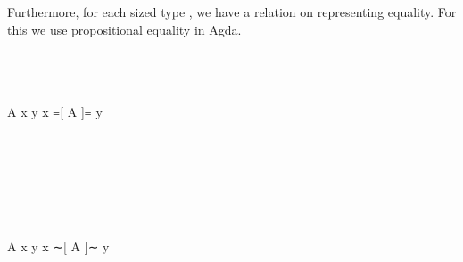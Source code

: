 Furthermore, for each sized type , we have a relation on  representing equality.
For this we use propositional equality in Agda.

\begin{code}%
\>[0]\AgdaSpace{}%
\AgdaSymbol{:}\AgdaSpace{}%
\AgdaSymbol{(}\AgdaSpace{}%
\AgdaSymbol{:}\AgdaSpace{}%
\AgdaSymbol{)}\AgdaSpace{}%
\AgdaSpace{}%
\AgdaSpace{}%
\AgdaSpace{}%
\<%
\\
\>[0]\AgdaSpace{}%
\AgdaSpace{}%
\AgdaSpace{}%
\AgdaSpace{}%
\AgdaSymbol{=}\AgdaSpace{}%
\AgdaSpace{}%
\AgdaSpace{}%
\<%
\\
%
\\[\AgdaEmptyExtraSkip]%
\>[0]\AgdaSpace{}%
 A x y \AgdaSymbol{=} x ≡[ A ]≡ y\<%
\end{code}

\begin{code}%
\>[0]\AgdaSpace{}%
\AgdaSymbol{:}\AgdaSpace{}%
\<%
\\
\>[0]\AgdaSpace{}%
\AgdaSpace{}%
\AgdaSymbol{=}\AgdaSpace{}%
\AgdaSpace{}%
\<%
\\
%
\\[\AgdaEmptyExtraSkip]%
\>[0]\AgdaSpace{}%
\AgdaSymbol{:}\AgdaSpace{}%
\AgdaSymbol{(}\AgdaSpace{}%
\AgdaSymbol{:}\AgdaSpace{}%
\AgdaSymbol{)}\AgdaSpace{}%
\AgdaSpace{}%
\AgdaSpace{}%
\AgdaSymbol{(}\AgdaSpace{}%
\AgdaSpace{}%
\AgdaSpace{}%
\AgdaSymbol{)}\AgdaSpace{}%
\AgdaSymbol{(}\AgdaSpace{}%
\AgdaSpace{}%
\AgdaSpace{}%
\AgdaSymbol{)}\<%
\\
\>[0]\AgdaSpace{}%
\AgdaSpace{}%
\AgdaSymbol{\{}\AgdaSymbol{\}}\AgdaSpace{}%
\AgdaSpace{}%
\AgdaSpace{}%
\AgdaSymbol{=}\AgdaSpace{}%
\AgdaSymbol{\{}\AgdaSpace{}%
\AgdaSymbol{:}\AgdaSpace{}%
\AgdaSpace{}%
\AgdaSymbol{\}}\AgdaSpace{}%
\AgdaSpace{}%
\AgdaSpace{}%
\AgdaSymbol{(}\AgdaSpace{}%
\AgdaSymbol{)}\AgdaSpace{}%
\AgdaSymbol{\{}\AgdaSymbol{\}}\AgdaSpace{}%
\AgdaFunction{≡[}\AgdaSpace{}%
\AgdaSpace{}%
\AgdaFunction{]≡}\AgdaSpace{}%
\AgdaSpace{}%
\AgdaSymbol{(}\AgdaSpace{}%
\AgdaSymbol{)}\<%
\\
%
\\[\AgdaEmptyExtraSkip]%
\>[0]\AgdaSpace{}%
 A x y \AgdaSymbol{=} x ∼[ A ]∼ y\<%
\end{code}

